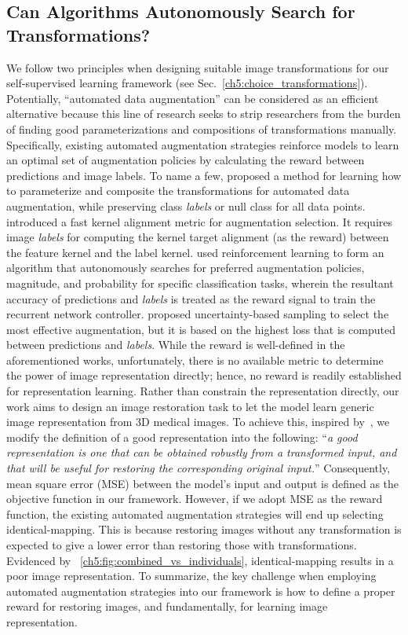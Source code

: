 \subsection{Can Algorithms Autonomously Search for Transformations?}
\label{ch5:transformation_augmentation}

We follow two principles when designing suitable image transformations for our self-supervised learning framework (see Sec.~\ref{ch5:choice_transformations}). Potentially, ``automated data augmentation'' can be considered as an efficient alternative because this line of research seeks to strip researchers from the burden of finding good parameterizations and compositions of transformations manually. Specifically, existing automated augmentation strategies reinforce models to learn an optimal set of augmentation policies by calculating the reward between predictions and image labels. To name a few, \citet{ratner2017learning} proposed a method for learning how to parameterize and composite the transformations for automated data augmentation, while preserving class \textit{labels} or null class for all data points. \citet{dao2019kernel} introduced a fast kernel alignment metric for augmentation selection. It requires image \textit{labels} for computing the kernel target alignment (as the reward) between the feature kernel and the label kernel. \citet{cubuk2019autoaugment} used reinforcement learning to form an algorithm that autonomously searches for preferred augmentation policies, magnitude, and probability for specific classification tasks, wherein the resultant accuracy of predictions and \textit{labels} is treated as the reward signal to train the recurrent network controller. \citet{wu2020generalization} proposed uncertainty-based sampling to select the most effective augmentation, but it is based on the highest loss that is computed between predictions and \textit{labels}. While the reward is well-defined in the aforementioned works, unfortunately, there is no available metric to determine the power of image representation directly; hence, no reward is readily established for representation learning. Rather than constrain the representation directly, our work aims to design an image restoration task to let the model learn generic image representation from 3D medical images. To achieve this, inspired by~\citet{vincent2010stacked}, we modify the definition of a good representation into the following: ``\textit{a good representation is one that can be obtained robustly from a transformed input, and that will be useful for restoring the corresponding original input.}'' Consequently, mean square error (MSE) between the model's input and output is defined as the objective function in our framework. However, if we adopt MSE as the reward function, the existing automated augmentation strategies will end up selecting identical-mapping. This is because restoring images without any transformation is expected to give a lower error than restoring those with transformations. Evidenced by \figurename~\ref{ch5:fig:combined_vs_individuals}, identical-mapping results in a poor image representation. To summarize, the key challenge when employing automated augmentation strategies into our framework is how to define a proper reward for restoring images, and fundamentally, for learning image representation.


